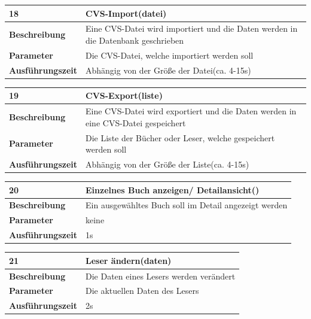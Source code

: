 \documentclass[fontsize=12pt,paper=a4,twoside]{scrartcl}
\begin{document}
  \begin{table}[htbp]
  \label{a18}
  \begin{tabular}{|l|p{10cm}|}
  \hline 
  \textbf{18} & \textbf{CVS-Import(datei)} \\ \hline
  \textbf{Beschreibung} & Eine CVS-Datei wird importiert und die Daten werden in die Datenbank geschrieben\\ \hline
  \textbf{Parameter} & Die CVS-Datei, welche importiert werden soll \\ \hline
  \textbf{Ausführungszeit} & Abhängig von der Größe der Datei(ca. 4-15s)\\ \hline
  \end{tabular}
  \end{table}

\newpage

  \begin{table}[htbp]
  \label{a19}
  \begin{tabular}{|l|p{10cm}|}
  \hline 
  \textbf{19} & \textbf{CVS-Export(liste)} \\ \hline
  \textbf{Beschreibung} & Eine CVS-Datei wird exportiert und die Daten werden in eine CVS-Datei gespeichert\\ \hline
  \textbf{Parameter} & Die Liste der Bücher oder Leser, welche gespeichert werden soll \\ \hline
  \textbf{Ausführungszeit} & Abhängig von der Größe der Liste(ca. 4-15s)\\ \hline
  \end{tabular}
  \end{table}

  \begin{table}[htbp]
  \label{a20}
  \begin{tabular}{|l|p{10cm}|}
  \hline 
  \textbf{20} & \textbf{Einzelnes Buch anzeigen/ Detailansicht()} \\ \hline
  \textbf{Beschreibung} & Ein ausgewähltes Buch soll im Detail angezeigt werden\\ \hline
  \textbf{Parameter} & keine \\ \hline
  \textbf{Ausführungszeit} & 1s\\ \hline
  \end{tabular}
  \end{table}

  \begin{table}[htbp]
  \label{a21}
  \begin{tabular}{|l|p{10cm}|}
  \hline 
  \textbf{21} & \textbf{Leser ändern(daten)} \\ \hline
  \textbf{Beschreibung} & Die Daten eines Lesers werden verändert\\ \hline
  \textbf{Parameter} & Die aktuellen Daten des Lesers \\ \hline
  \textbf{Ausführungszeit} & 2s\\ \hline
  \end{tabular}
  \end{table}
\end{document}
